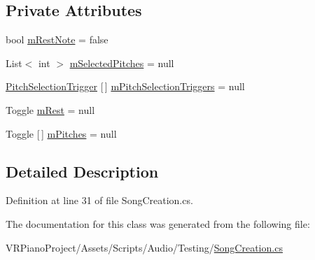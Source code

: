 \subsection*{Private Attributes}
\begin{DoxyCompactItemize}
\item 
bool \hyperlink{group___s_c_handlers_gace289a908db9ba443c50ec8656ae05b1}{m\+Rest\+Note} = false
\item 
List$<$ int $>$ \hyperlink{group___s_c_handlers_ga816236cbae1f13ea34be94fb1b86b7cd}{m\+Selected\+Pitches} = null
\item 
\hyperlink{group___s_c_handlers_class_song_creation_1_1_pitch_selection_container_1_1_pitch_selection_trigger}{Pitch\+Selection\+Trigger} \mbox{[}$\,$\mbox{]} \hyperlink{group___s_c_handlers_ga1affedf973b4aa39505b35053c12df7e}{m\+Pitch\+Selection\+Triggers} = null
\item 
Toggle \hyperlink{group___s_c_handlers_ga41e99d322cb92a3eb304bef704af2b7a}{m\+Rest} = null
\item 
Toggle \mbox{[}$\,$\mbox{]} \hyperlink{group___s_c_handlers_ga19dbd38f92df12e9b3d52b01634fdc53}{m\+Pitches} = null
\end{DoxyCompactItemize}


\subsection{Detailed Description}


Definition at line 31 of file Song\+Creation.\+cs.



The documentation for this class was generated from the following file\+:\begin{DoxyCompactItemize}
\item 
V\+R\+Piano\+Project/\+Assets/\+Scripts/\+Audio/\+Testing/\hyperlink{_song_creation_8cs}{Song\+Creation.\+cs}\end{DoxyCompactItemize}
